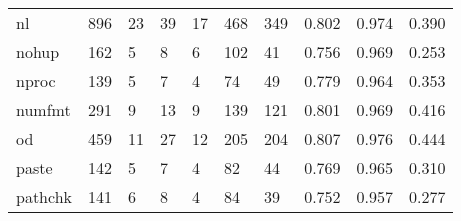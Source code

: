 \begin{longtable}{lp{2.0cm}p{2.0cm}p{2.0cm}p{2.0cm}p{2.0cm}p{2.0cm}p{2.0cm}p{2.0cm}p{2.0cm}}
nl        &                    896 &                                 23 &                                39 &                               17 &                               468 &                             349 &                                   0.802 &                                  0.974 &                                0.390 \\
nohup     &                    162 &                                  5 &                                 8 &                                6 &                               102 &                              41 &                                   0.756 &                                  0.969 &                                0.253 \\
nproc     &                    139 &                                  5 &                                 7 &                                4 &                                74 &                              49 &                                   0.779 &                                  0.964 &                                0.353 \\
numfmt    &                    291 &                                  9 &                                13 &                                9 &                               139 &                             121 &                                   0.801 &                                  0.969 &                                0.416 \\
od        &                    459 &                                 11 &                                27 &                               12 &                               205 &                             204 &                                   0.807 &                                  0.976 &                                0.444 \\
paste     &                    142 &                                  5 &                                 7 &                                4 &                                82 &                              44 &                                   0.769 &                                  0.965 &                                0.310 \\
pathchk   &                    141 &                                  6 &                                 8 &                                4 &                                84 &                              39 &                                   0.752 &                                  0.957 &                                0.277 \\

\end{longtable}
